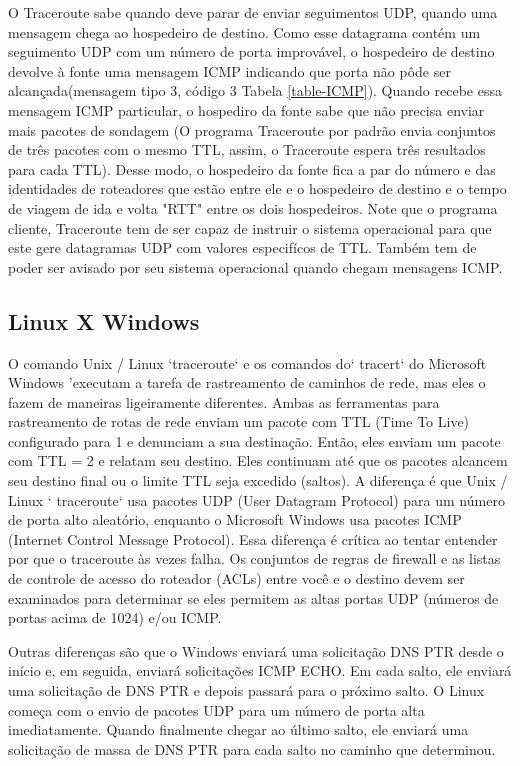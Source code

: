 \documentclass[
	article,			%
	11pt,				%
	oneside,			%
	a4paper,			%
	english,			%
	brazil,				%
	sumario=tradicional
	]{abntex2}
\begin{document}
O Traceroute sabe quando deve parar de enviar seguimentos UDP, quando uma mensagem chega ao hospedeiro de destino. Como esse datagrama contém um seguimento UDP com um número de porta improvável, o hospedeiro de destino devolve à fonte uma mensagem ICMP indicando que porta não pôde ser alcançada(mensagem tipo 3, código 3 Tabela \ref{table-ICMP}). Quando recebe essa mensagem ICMP particular, o hospediro da fonte sabe que não precisa enviar mais pacotes de sondagem (O programa Traceroute por padrão envia conjuntos de três pacotes com o mesmo TTL, assim, o Traceroute espera três resultados para cada TTL). Desse modo, o hospedeiro da fonte fica a par do número e das identidades de roteadores que estão entre ele e o hospedeiro de destino e o tempo de viagem de ida e volta "RTT" entre os dois hospedeiros. Note que o programa cliente, Traceroute tem de ser capaz de instruir o sistema operacional para que este gere datagramas UDP com valores especifícos de TTL. Também tem de poder ser avisado por seu sistema operacional quando chegam mensagens ICMP.

\subsection{Linux X Windows}
O comando Unix / Linux `traceroute` e os comandos do` tracert` do Microsoft Windows 'executam a tarefa de rastreamento de caminhos de rede, mas eles o fazem de maneiras ligeiramente diferentes. Ambas as ferramentas para rastreamento de rotas de rede enviam um pacote com TTL (Time To Live) configurado para 1 e denunciam a sua destinação. Então, eles enviam um pacote com TTL = 2 e relatam seu destino. Eles continuam até que os pacotes alcancem seu destino final ou o limite TTL seja excedido (saltos). A diferença é que Unix / Linux ` traceroute` usa pacotes UDP (User Datagram Protocol) para um número de porta alto aleatório, enquanto o Microsoft Windows usa pacotes ICMP (Internet Control Message Protocol). Essa diferença é crítica ao tentar entender por que o traceroute às vezes falha. Os conjuntos de regras de firewall e as listas de controle de acesso do roteador (ACLs) entre você e o destino devem ser examinados para determinar se eles permitem as altas portas UDP (números de portas acima de 1024) e/ou ICMP.\cite{tech-faq}

Outras diferenças são que o Windows enviará uma solicitação DNS PTR desde o início e, em seguida, enviará solicitações ICMP ECHO. Em cada salto, ele enviará uma solicitação de DNS PTR e depois passará para o próximo salto. 
O Linux começa com o envio de pacotes UDP para um número de porta alta imediatamente. Quando finalmente chegar ao último salto, ele enviará uma solicitação de massa de DNS PTR para cada salto no caminho que determinou. \cite{Darren}
\end{document}
